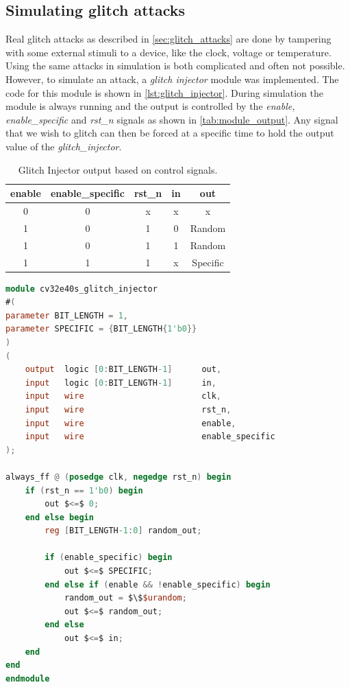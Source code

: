 \subsection{Simulating glitch attacks}
\label{subsec:sim_glitch}

Real glitch attacks as described in \autoref{sec:glitch_attacks} are done by tampering with some external stimuli to a device, like the clock, voltage or temperature. Using the same attacks in simulation is both complicated and often not possible. However, to simulate an attack, a \textit{glitch injector} module was implemented. The code for this module is shown in \autoref{lst:glitch_injector}. During simulation the module is always running and the output is controlled by the \textit{enable, enable\_specific} and \textit{rst\_n} signals as shown in \autoref{tab:module_output}. Any signal that we wish to glitch can then be forced at a specific time to hold the output value of the \textit{glitch\_injector}.

\begin{table}[h]
\centering
\caption{Glitch Injector output based on control signals.}
\label{tab:module_output}
\begin{tabular}{ccccc}
\toprule 
\rowcolor{black!20} \textbf{enable} & \textbf{enable\_specific} & \textbf{rst\_n} & \textbf{in} & \textbf{out} \\
\midrule
0 & 0 & x & x & x \\
\rowcolor{black!20} 1 & 0 & 1 & 0 & Random \\
1 & 0 & 1 & 1 & Random \\
\rowcolor{black!20} 1 & 1 & 1 & x & Specific \\
\bottomrule
\end{tabular}
\end{table}

\begin{lstlisting}[caption={SystemVerilog code for the glitch\_injector module}, label=lst:glitch_injector, language=verilog]
module cv32e40s_glitch_injector 
#(
parameter BIT_LENGTH = 1, 
parameter SPECIFIC = {BIT_LENGTH{1'b0}}
)
(
    output  logic [0:BIT_LENGTH-1]      out,
    input   logic [0:BIT_LENGTH-1]      in,
    input   wire                        clk,
    input   wire                        rst_n,
    input   wire                        enable,
    input   wire                        enable_specific    
);

always_ff @ (posedge clk, negedge rst_n) begin 
    if (rst_n == 1'b0) begin 
        out $<=$ 0;
    end else begin
        reg [BIT_LENGTH-1:0] random_out; 

        if (enable_specific) begin
            out $<=$ SPECIFIC;
        end else if (enable && !enable_specific) begin
            random_out = $\$$urandom;
            out $<=$ random_out; 
        end else
            out $<=$ in;  
    end
end
endmodule
\end{lstlisting}

